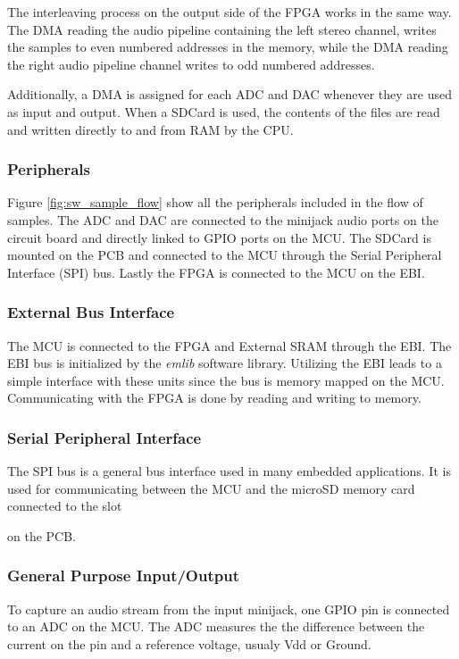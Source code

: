 The interleaving process on the output side of the FPGA works in the same way.
The DMA reading the audio pipeline containing the left stereo channel, writes
the samples to even numbered addresses in the memory, while the DMA reading the
right audio pipeline channel writes to odd numbered addresses.

Additionally, a DMA is assigned for each ADC and DAC whenever they are used as
input and output. When a SDCard is used, the contents of the files are read and
written directly to and from RAM by the CPU.

\subsubsection{Peripherals}



Figure \ref{fig:sw_sample_flow} show all the peripherals included in the flow of samples.
The ADC and DAC are connected to the minijack audio ports on the circuit board and directly
linked to GPIO ports on the MCU. The SDCard
is mounted on the PCB and connected to the MCU through the Serial Peripheral Interface (SPI)
bus. Lastly the FPGA is connected to the MCU on the EBI.

\subsubsection{External Bus Interface}
The MCU is connected to the FPGA and External SRAM through the EBI. The EBI bus
is initialized by the {\it emlib} software library. Utilizing
the EBI leads to a simple interface with these units since the bus is memory
mapped on the MCU. Communicating with the FPGA is done by reading and writing to memory.

\subsubsection{Serial Peripheral Interface}
The SPI bus is a general bus interface used in many embedded applications. It is used
for communicating between the MCU and the microSD memory card connected to the slot

on the PCB.

\subsubsection{General Purpose Input/Output}
To capture an audio stream from the input minijack, one GPIO pin is connected to an
ADC on the MCU. The ADC measures the the difference between the current on the pin
and a reference voltage, usualy Vdd or Ground.



